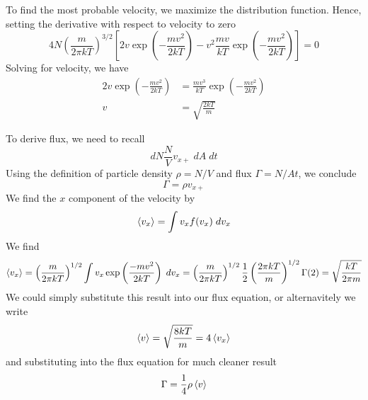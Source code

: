 \documentclass[../../../Main.tex]{subfiles}
\begin{document}
To find the most probable velocity, we maximize the distribution function. Hence, setting the derivative with respect to velocity to zero
\begin{equation*}
    4N\left(\frac{m}{2\pi kT}\right)^{3/2}\left[2v\exp\left(-\frac{m v^2}{2k T}\right)-v^2\frac{mv}{kT}\exp\left(-\frac{m v^2}{2k T}\right)\right]=0
\end{equation*}
Solving for velocity, we have 
\begin{align*}
    2v\exp\left(-\frac{m v^2}{2k T}\right)&=\frac{mv^3}{kT}\exp\left(-\frac{m v^2}{2k T}\right)\\
    v&=\sqrt{\frac{2kT}{m}}
\end{align*}

To derive flux, we need to recall
\begin{equation*}
    dN\frac{N}{V}v_{x+}\;dA\;dt
\end{equation*}
Using the definition of particle density $\rho=N/V$ and flux $\Gamma=N/At$, we conclude 
\begin{equation*}
    \Gamma=\rho v_{x+}
\end{equation*}
We find the $x$ component of the velocity by 
\begin{equation*}
    \braket{v_x}=\int v_xf(v_x)\;dv_x
\end{equation*} 
We find 
\begin{equation*}
    \braket{v_x}=\left(\frac{m}{2\pi kT}\right)^{1/2}\int v_x\exp\left(\frac{-m v^2}{2kT}\right)\;dv_x=\left(\frac{m}{2\pi kT}\right)^{1/2}\frac{1}{2}\left(\frac{2\pi kT}{m}\right)^{1/2}\Gamma(2)=\sqrt{\frac{kT}{2\pi m}}
\end{equation*}
We could simply substitute this result into our flux equation, or alternavitely we write 
\begin{equation*}
    \braket{v}=\sqrt{\frac{8kT}{m}}=4\braket{v_x}
\end{equation*}
and substituting into the flux equation for much cleaner result
\begin{equation*}
    \Gamma=\frac{1}{4}\rho\braket{v}
\end{equation*}
\end{document}
